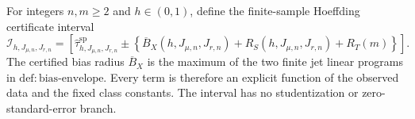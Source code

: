 For integers \(n,m\ge2\) and \(h\in(0,1)\), define the finite-sample Hoeffding certificate interval
\[
\mathcal I_{h,J_{\mu,n},J_{r,n}}
=\left[
\widehat\tau^{\mathrm{sp}}_{h,J_{\mu,n},J_{r,n}}
\pm\left\{\overline B_X(h,J_{\mu,n},J_{r,n})+R_S(h,J_{\mu,n},J_{r,n})+R_T(m)\right\}
\right].
\]
The certified bias radius \(\overline B_X\) is the maximum of the two finite jet linear programs in \(\mathrm{def:bias\text{-}envelope}\). Every term is therefore an explicit function of the observed data and the fixed class constants. The interval has no studentization or zero-standard-error branch.